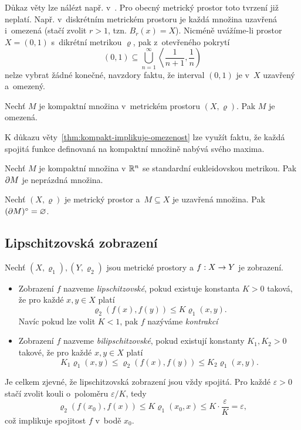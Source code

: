 Důkaz věty lze nálézt např. v~\citep[str. 166]{NetukaAnalyza2014}. Pro obecný metrický prostor toto tvrzení již neplatí. Např. v~diskrétním metrickém prostoru je každá množina uzavřená i~omezená (stačí zvolit $r>1$, tzn. $B_r(x)=X$). Nicméně uvážíme-li prostor $X=(0,1)$ s~dikrétní metrikou $\varrho$, pak z~otevřeného pokrytí
\[(0,1)\subseteq\bigcup_{n=1}^\infty\left\langle\dfrac{1}{n+1},\dfrac{1}{n}\right)\]
nelze vybrat žádné konečné, navzdory faktu, že interval $(0,1)$ je v~$X$ uzavřený a~omezený.
\begin{theorem}\label{thm:kompakt-implikuje-omezenost}
    Nechť $M$ je kompaktní množina v~metrickém prostoru $(X,\varrho)$. Pak $M$ je omezená.
\end{theorem}
K důkazu věty~\ref{thm:kompakt-implikuje-omezenost} lze využít faktu, že každá spojitá funkce definovaná na kompaktní množině nabývá svého maxima.
\begin{theorem}\label{thm:neprazdna-hranice-kompaktu}
    Nechť $M$ je kompaktní množina v $\mathbb{R}^n$ se standardní eukleidovskou metrikou. Pak $\partial M$ je neprázdná množina.
\end{theorem}
\begin{theorem}\label{thm:vnitrek-hranice-uz-mnoziny}
    Nechť $(X,\varrho)$ je metrický prostor a~$M\subseteq X$ je uzavřená množina. Pak $(\partial M)^\circ=\varnothing$.
\end{theorem}

\subsection{Lipschitzovská zobrazení}\label{subsec:lipschitzovska-zobrazeni}

\begin{definition}\label{def:bilipschitzovske-zobrazeni}
    Nechť $(X,\varrho_1),(Y,\varrho_2)$ jsou metrické prostory a $f:X \rightarrow Y$ je zobrazení.
    \begin{itemize}
        \item Zobrazení $f$ nazveme \emph{lipschitzovské}, pokud existuje konstanta $K>0$ taková, že pro každé $x,y\in X$ platí
        \[\varrho_2(f(x),f(y))\leqslant K\varrho_1(x,y).\]
        Navíc pokud lze volit $K<1$, pak $f$ nazýváme \emph{kontrakcí}
        \item Zobrazení $f$ nazveme \emph{bilipschitzovské}, pokud existují konstanty $K_1,K_2>0$ takové, že pro každé $x,y\in X$ platí
        \[K_1\varrho_1(x,y)\leqslant\varrho_2(f(x),f(y))\leqslant K_2\varrho_1(x,y).\]
    \end{itemize}
\end{definition}
Je celkem zjevné, že lipschitzovská zobrazení jsou vždy spojitá. Pro každé $\varepsilon>0$ stačí zvolit kouli o~poloměru $\varepsilon/K$, tedy
\[\varrho_2(f(x_0),f(x))\leqslant K\varrho_1(x_0,x)\leqslant K\cdot\dfrac{\varepsilon}{K}=\varepsilon,\]
což implikuje spojitost $f$ v~bodě $x_0$.